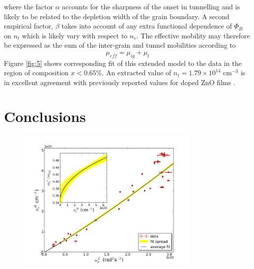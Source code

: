 \documentclass[aps,prl,preprint,showpacs,showkeys,linenumbers]{revtex4-1}
\begin{document}
where the factor $\alpha$ accounts for the sharpness of the onset in tunnelling and is likely to be related to the depletion width of the grain boundary. A second empirical factor, $\beta$ takes into account of any extra functional dependence of $\Phi_B$ on $n_t$ which is likely vary with respect to $n_e$. The effective mobility may therefore be expressed as the sum of the inter-grain and tunnel mobilities according to
\begin{equation}
\label{eqn:14}
\mu_{eff} = \mu_{ig}+\mu_{t}
\end{equation}
Figure \ref{fig:5} shows corresponding fit of this extended model to the data in the region of composition $x<0.65\%$. An extracted value of $n_t = 1.79\times10^{14}$ cm$^{-3}$ is in excellent agreement with previously reported values for doped ZnO films \cite{}.


\section{Conclusions}

\begin{acknowledgements}

\end{acknowledgements}




\begin{figure}[0]
\centering
\caption{\label{fig:1}}
\end{figure}

\begin{figure}[p]
\centering
\caption{\label{fig:2}}
\end{figure}

\begin{figure}[p]
\centering
\includegraphics[width = 0.8\textwidth]{figure1c}
\caption{\label{fig:3}}
\end{figure}
\end{document}
